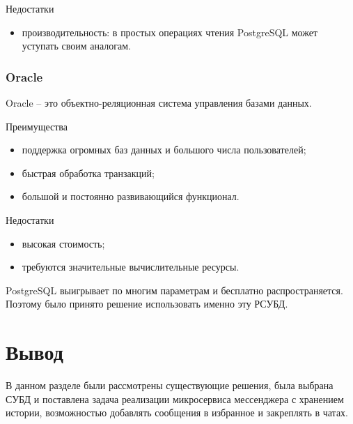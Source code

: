 Недостатки
\begin{itemize}
\item производительность: в простых операциях чтения PostgreSQL может уступать своим аналогам. 
\end{itemize}

\subsubsection{\textbf{Oracle}}

Oracle -- это объектно-реляционная система управления базами данных.

Преимущества
\begin{itemize}
\item поддержка огромных баз данных и большого числа пользователей;
\item быстрая обработка транзакций;
\item большой и постоянно развивающийся функционал. 
\end{itemize}

Недостатки
\begin{itemize}
\item высокая стоимость;
\item требуются значительные вычислительные ресурсы.  
\end{itemize}

PostgreSQL выигрывает по многим параметрам и бесплатно распространяется. Поэтому было принято решение использовать именно эту РСУБД.

\section{\textbf{Вывод}}

В данном разделе были рассмотрены существующие решения, была выбрана СУБД и поставлена задача реализации микросервиса мессенджера с хранением истории, возможностью добавлять сообщения в избранное и закреплять в чатах. 